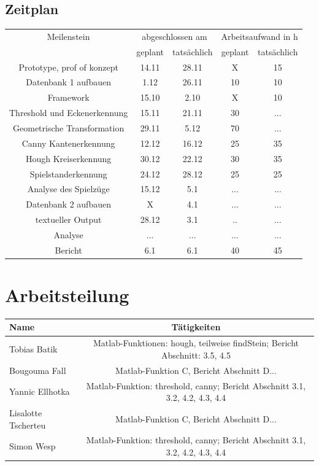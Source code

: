 \documentclass[paper=A4, deutsch]{scrartcl}
\begin{document}
\subsection{Zeitplan}

\begin{table}[h!]
	\centering
	\begin{tabular}{|c|c|c|c|c|}
		\hline
		Meilenstein & \multicolumn{2}{c|}{abgeschlossen am} & \multicolumn{2}{c|}{Arbeitsaufwand in h}\\
		\cline{2-5}
		 & geplant & tatsächlich & geplant & tatsächlich\\
		\hline
				Prototype, prof of konzept & 14.11 & 28.11 & X & 15\\
		\hline
				Datenbank 1 aufbauen & 1.12 & 26.11 & 10 & 10\\
		\hline
				Framework &15.10 &2.10 & X & 10\\
		\hline	
				Threshold und Eckenerkennung & 15.11 & 21.11 & 30 &...\\
		\hline	
				Geometrische Transformation & 29.11 & 5.12 & 70 &...\\
		\hline	
				Canny Kantenerkennung & 12.12 & 16.12 & 25 & 35\\
		\hline	
				Hough Kreiserkennung & 30.12 & 22.12 & 30 & 35\\
		\hline	
				Spielstanderkennung & 24.12 & 28.12 & 25 & 25\\
		\hline	
				Analyse des Spielzüge & 15.12 & 5.1 &... &...\\
		\hline	
				Datenbank 2 aufbauen & X & 4.1 &... &...\\
		\hline
				textueller Output & 28.12 &  3.1 &..&... \\
		\hline 
				Analyse &... &... &... &...\\
		\hline
				Bericht & 6.1 & 6.1 & 40 & 45\\
		\hline
	\end{tabular}
\end{table}

\section{Arbeitsteilung}
\begin{center}
  \begin{tabular}{ |l | c | }
    \hline
  Name & Tätigkeiten\\
    \hline
			Tobias Batik & Matlab-Funktionen: hough, teilweise findStein; Bericht Abschnitt: 3.5, 4.5\\
		\hline
			Bougouma Fall & Matlab-Funktion C, Bericht Abschnitt D...\\
		\hline
			Yannic Ellhotka & Matlab-Funktion: threshold, canny; Bericht Abschnitt 3.1, 3.2, 4.2, 4.3, 4.4\\
		\hline
			Lisalotte Tscherteu & Matlab-Funktion C, Bericht Abschnitt D...\\
		\hline
			Simon Wesp & Matlab-Funktion: threshold, canny; Bericht Abschnitt 3.1, 3.2, 4.2, 4.3, 4.4\\
		\hline
  \end{tabular}
\end{center}
\end{document}
